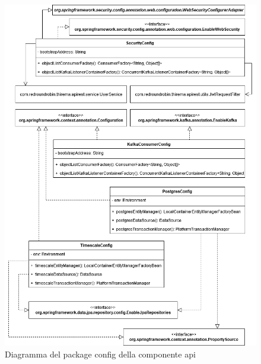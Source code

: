 		\begin{figure}[H]
			\centering
			\includegraphics[scale=0.550]{res/images/API/ConfigPackage.png}
			\caption{Diagramma del package config della componente api}
			\label{Diagramma 12}
		\end{figure}
